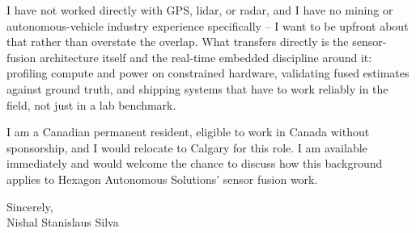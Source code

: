 \documentclass[11pt]{article}
\begin{document}
I have not worked directly with GPS, lidar, or radar, and I have no mining or autonomous-vehicle industry experience specifically -- I want to be upfront about that rather than overstate the overlap. What transfers directly is the sensor-fusion architecture itself and the real-time embedded discipline around it: profiling compute and power on constrained hardware, validating fused estimates against ground truth, and shipping systems that have to work reliably in the field, not just in a lab benchmark.

I am a Canadian permanent resident, eligible to work in Canada without sponsorship, and I would relocate to Calgary for this role. I am available immediately and would welcome the chance to discuss how this background applies to Hexagon Autonomous Solutions' sensor fusion work.

Sincerely, \\
Nishal Stanislaus Silva
\end{document}
